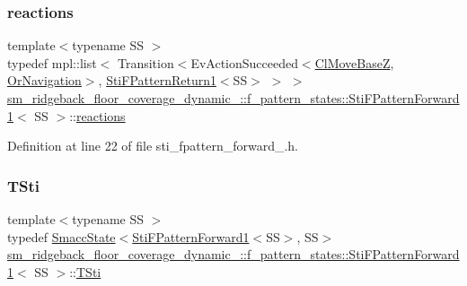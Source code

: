 \subsubsection{\texorpdfstring{reactions}{reactions}}
{\footnotesize\ttfamily template$<$typename SS $>$ \\
typedef mpl\+::list$<$ Transition$<$Ev\+Action\+Succeeded$<$\hyperlink{classcl__move__base__z_1_1ClMoveBaseZ}{Cl\+Move\+BaseZ}, \hyperlink{classsm__ridgeback__floor__coverage__dynamic__1_1_1OrNavigation}{Or\+Navigation}$>$, \hyperlink{structsm__ridgeback__floor__coverage__dynamic__1_1_1f__pattern__states_1_1StiFPatternReturn1}{Sti\+F\+Pattern\+Return1}$<$SS$>$ $>$ $>$ \hyperlink{structsm__ridgeback__floor__coverage__dynamic__1_1_1f__pattern__states_1_1StiFPatternForward1}{sm\+\_\+ridgeback\+\_\+floor\+\_\+coverage\+\_\+dynamic\+\_\+::f\+\_\+pattern\+\_\+states\+::\+Sti\+F\+Pattern\+Forward1}$<$ SS $>$\+::\hyperlink{structsm__ridgeback__floor__coverage__dynamic__1_1_1f__pattern__states_1_1StiFPatternForward1_a6c1b9c5967a72ecd7dd8cc57d1f8566a}{reactions}}



Definition at line 22 of file sti\+\_\+fpattern\+\_\+forward\+\_.\+h.

\mbox{\label{structsm__ridgeback__floor__coverage__dynamic__1_1_1f__pattern__states_1_1StiFPatternForward1_a4fc6ee65990cb3ac1ec6d448d2a1ca4c}} 
\subsubsection{\texorpdfstring{T\+Sti}{TSti}}
{\footnotesize\ttfamily template$<$typename SS $>$ \\
typedef \hyperlink{classSmaccState}{Smacc\+State}$<$\hyperlink{structsm__ridgeback__floor__coverage__dynamic__1_1_1f__pattern__states_1_1StiFPatternForward1}{Sti\+F\+Pattern\+Forward1}$<$SS$>$, SS$>$ \hyperlink{structsm__ridgeback__floor__coverage__dynamic__1_1_1f__pattern__states_1_1StiFPatternForward1}{sm\+\_\+ridgeback\+\_\+floor\+\_\+coverage\+\_\+dynamic\+\_\+::f\+\_\+pattern\+\_\+states\+::\+Sti\+F\+Pattern\+Forward1}$<$ SS $>$\+::\hyperlink{structsm__ridgeback__floor__coverage__dynamic__1_1_1f__pattern__states_1_1StiFPatternForward1_a4fc6ee65990cb3ac1ec6d448d2a1ca4c}{T\+Sti}}



